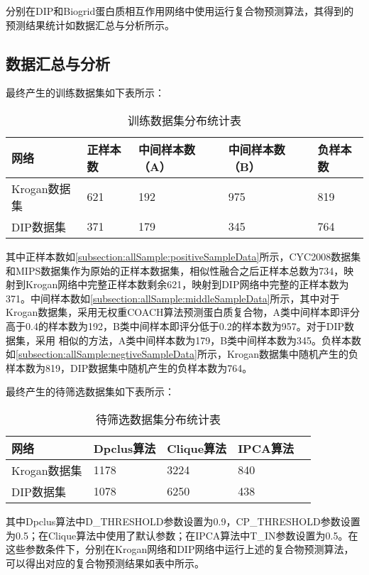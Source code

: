 分别在DIP和Biogrid蛋白质相互作用网络中使用运行复合物预测算法，其得到的预测结果统计如数据汇总与分析所示。




\subsection{数据汇总与分析}
\label{subsection:allSample:summary}

最终产生的训练数据集如下表所示：

\begin{table}[h]
    \centering
    \caption{训练数据集分布统计表}
    \label{tab:datasets:statistic:train}
    \begin{tabular}{C{3cm}C{2cm}C{3cm}C{3cm}C{2cm}}
        \toprule
        \textbf{网络} & \textbf{正样本数} & \textbf{中间样本数（A）} & \textbf{中间样本数（B）} & \textbf{负样本数} \\
        \midrule
        Krogan数据集  & 621               & 192                      & 975                      & 819               \\
        DIP数据集     & 371               & 179                      & 345                      & 764               \\
        \bottomrule
    \end{tabular}
\end{table}
其中正样本数如\ref{subsection:allSample:positiveSampleData}所示，CYC2008数据集和MIPS数据集作为原始的正样本数据集，相似性融合之后正样本总数为734，映射到Krogan网络中完整正样本数剩余621，映射到DIP网络中完整的正样本数为371。中间样本数如\ref{subsection:allSample:middleSampleData}所示，其中对于Krogan数据集，采用无权重COACH算法预测蛋白质复合物，A类中间样本即评分高于0.4的样本数为192，B类中间样本即评分低于0.2的样本数为957。对于DIP数据集，采用
相似的方法，A类中间样本数为179，B类中间样本数为345。负样本数如\ref{subsection:allSample:negtiveSampleData}所示，Krogan数据集中随机产生的负样本数为819，DIP数据集中随机产生的负样本数为764。

最终产生的待筛选数据集如下表所示：
\begin{table}[h]
    \centering
    \caption{待筛选数据集分布统计表}
    \label{tab:datasets:statistic:beselect}
    \begin{tabular}{C{3cm}C{2cm}C{3cm}C{3cm}C{2cm}}
        \toprule
        \textbf{网络} & \textbf{Dpclus算法} & \textbf{Clique算法} & \textbf{IPCA算法} \\
        \midrule
        Krogan数据集  & 1178                & 3224                & 840               \\
        DIP数据集     & 1078                & 6250                & 438               \\
        \bottomrule
    \end{tabular}
\end{table}
其中Dpclus算法中D\_THRESHOLD参数设置为0.9，CP\_THRESHOLD参数设置为0.5；在Clique算法中使用了默认参数；在IPCA算法中T\_IN参数设置为0.5。在这些参数条件下，分别在Krogan网络和DIP网络中运行上述的复合物预测算法，可以得出对应的复合物预测结果如表中所示。

